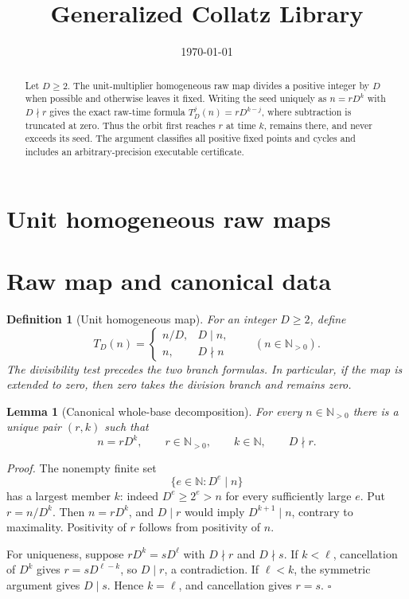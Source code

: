\documentclass[11pt,letterpaper]{article}
\title{Generalized Collatz Library}
\author{}
\date{\today}
\newcommand{\N}{\mathbb{N}}
\newtheorem{lemma}[theorem]{Lemma}
\newtheorem{definition}[theorem]{Definition}
\newenvironment{proof}{\noindent\textit{Proof.}}{\hfill\(\square\)}
\begin{document}
\maketitle
\section*{Unit homogeneous raw maps}

\begin{abstract}
Let $D\geq2$.  The unit-multiplier homogeneous raw map divides a positive
integer by $D$ when possible and otherwise leaves it fixed.  Writing the seed
uniquely as $n=rD^k$ with $D\nmid r$ gives the exact raw-time formula
$T_D^j(n)=rD^{k-j}$, where subtraction is truncated at zero.  Thus the orbit
first reaches $r$ at time $k$, remains there, and never exceeds its seed.  The
argument classifies all positive fixed points and cycles and includes an
arbitrary-precision executable certificate.
\end{abstract}

\section{Raw map and canonical data}

\begin{definition}[Unit homogeneous map]
For an integer $D\geq2$, define
\[
 T_D(n)=
 \begin{cases}
  n/D,&D\mid n,\\
  n,&D\nmid n
 \end{cases}
 \qquad(n\in\N_{>0}).
\]
The divisibility test precedes the two branch formulas.  In particular, if
the map is extended to zero, then zero takes the division branch and remains
zero.
\end{definition}

\begin{lemma}[Canonical whole-base decomposition]
\label{lem:decomposition}
For every $n\in\N_{>0}$ there is a unique pair $(r,k)$ such that
\[
 n=rD^k,\qquad r\in\N_{>0},\qquad k\in\N,
 \qquad D\nmid r.
\]
\end{lemma}

\begin{proof}
The nonempty finite set
\[
 \{e\in\N:D^e\mid n\}
\]
has a largest member $k$: indeed $D^e\geq2^e>n$ for every sufficiently large
$e$.  Put $r=n/D^k$.  Then $n=rD^k$, and $D\mid r$ would imply
$D^{k+1}\mid n$, contrary to maximality.  Positivity of $r$ follows from
positivity of $n$.

For uniqueness, suppose
$rD^k=sD^\ell$ with $D\nmid r$ and $D\nmid s$.  If $k<\ell$, cancellation of
$D^k$ gives $r=sD^{\ell-k}$, so $D\mid r$, a contradiction.  If $\ell<k$,
the symmetric argument gives $D\mid s$.  Hence $k=\ell$, and cancellation
gives $r=s$.
\end{proof}
\end{document}
